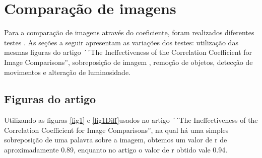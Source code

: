 \documentclass[10pt,a4paper]{article}
\begin{document}

\newpage
\section{Comparação de imagens}

Para a comparação de imagens através do coeficiente, foram realizados diferentes testes
. As seções a seguir apresentam as variações dos testes: utilização
das mesmas figuras do artigo ´´The Ineffectiveness of the Correlation
Coefficient for Image Comparisons'', sobreposição de imagem , remoção de objetos, detecção
de movimentos e alteração de luminosidade.  

\subsection{Figuras do artigo }
Utilizando as figuras \ref{fig1} e \ref{fig1Diff}usados no artigo ´´The Ineffectiveness of the Correlation
Coefficient for Image Comparisons'', na qual há uma simples
sobreposição de uma palavra sobre a imagem, obtemos um valor de r de
aproximadamente 0.89, enquanto no artigo o valor de r obtido vale 0.94.
\end{document}
